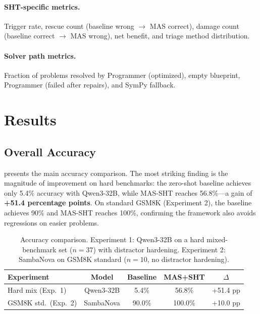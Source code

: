 \documentclass[11pt,a4paper]{article}
\begin{document}
\paragraph{SHT-specific metrics.}
Trigger rate, rescue count (baseline wrong $\to$ MAS correct), damage count (baseline correct $\to$ MAS wrong), net benefit, and triage method distribution.
\paragraph{Solver path metrics.}
Fraction of problems resolved by Programmer (optimized), empty blueprint, Programmer (failed after repairs), and SymPy fallback.
\section{Results}
\label{sec:results}
\subsection{Overall Accuracy}
 presents the main accuracy comparison.
The most striking finding is the magnitude of improvement on hard benchmarks: the zero-shot baseline achieves only 5.4\% accuracy with Qwen3-32B, while MAS-SHT reaches 56.8\%---a gain of \textbf{+51.4 percentage points}.
On standard GSM8K (Experiment 2), the baseline achieves 90\% and MAS-SHT reaches 100\%, confirming the framework also avoids regressions on easier problems.
\begin{table}[h]
\centering
\caption{Accuracy comparison. Experiment 1: Qwen3-32B on a hard mixed-benchmark set ($n=37$) with distractor hardening. Experiment 2: SambaNova on GSM8K standard ($n=10$, no distractor hardening).}
\label{tab:main_results}
\begin{tabular}{lcccc}
\toprule
\textbf{Experiment} & \textbf{Model} & \textbf{Baseline} & \textbf{MAS+SHT} & \textbf{$\Delta$} \\
\midrule
Hard mix (Exp.~1)     & Qwen3-32B   & 5.4\%   & 56.8\%  & +51.4 pp \\
GSM8K std.\ (Exp.~2)  & SambaNova   & 90.0\%  & 100.0\% & +10.0 pp \\
\bottomrule
\end{tabular}
\end{table}
\end{document}
